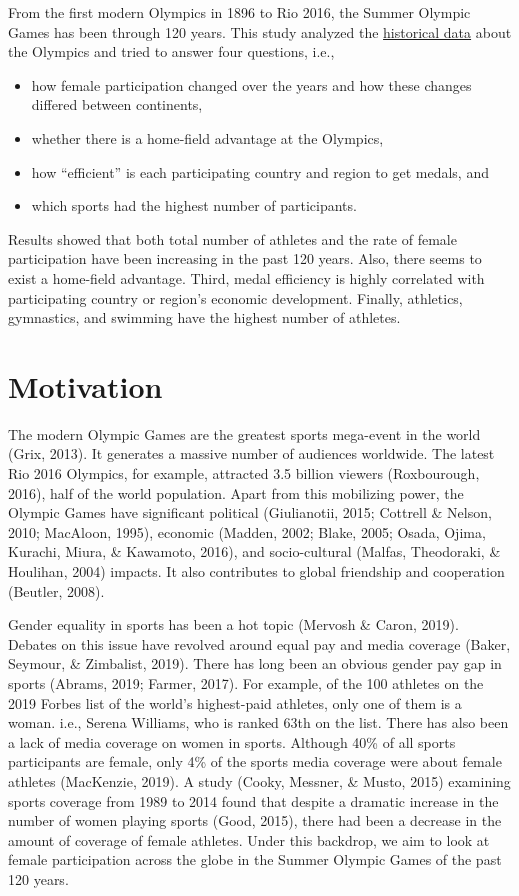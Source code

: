 \documentclass[
]{article}
\begin{document}
From the first modern Olympics in 1896 to Rio 2016, the Summer Olympic Games has been through 120 years. This study analyzed the \href{https://github.com/rgriff23/Olympic_history}{historical data} about the Olympics and tried to answer four questions, i.e.,

\begin{itemize}
\item
  how female participation changed over the years and how these changes differed between continents,
\item
  whether there is a home-field advantage at the Olympics,
\item
  how ``efficient'' is each participating country and region to get medals, and
\item
  which sports had the highest number of participants.
\end{itemize}

Results showed that both total number of athletes and the rate of female participation have been increasing in the past 120 years. Also, there seems to exist a home-field advantage. Third, medal efficiency is highly correlated with participating country or region's economic development. Finally, athletics, gymnastics, and swimming have the highest number of athletes.

\hypertarget{motivation}{%
\section{Motivation}\label{motivation}}

The modern Olympic Games are the greatest sports mega-event in the world (Grix, 2013). It generates a massive number of audiences worldwide. The latest Rio 2016 Olympics, for example, attracted 3.5 billion viewers (Roxbourough, 2016), half of the world population. Apart from this mobilizing power, the Olympic Games have significant political (Giulianotii, 2015; Cottrell \& Nelson, 2010; MacAloon, 1995), economic (Madden, 2002; Blake, 2005; Osada, Ojima, Kurachi, Miura, \& Kawamoto, 2016), and socio-cultural (Malfas, Theodoraki, \& Houlihan, 2004) impacts. It also contributes to global friendship and cooperation (Beutler, 2008).

Gender equality in sports has been a hot topic (Mervosh \& Caron, 2019). Debates on this issue have revolved around equal pay and media coverage (Baker, Seymour, \& Zimbalist, 2019). There has long been an obvious gender pay gap in sports (Abrams, 2019; Farmer, 2017). For example, of the 100 athletes on the 2019 Forbes list of the world's highest-paid athletes, only one of them is a woman. i.e., Serena Williams, who is ranked 63th on the list. There has also been a lack of media coverage on women in sports. Although 40\% of all sports participants are female, only 4\% of the sports media coverage were about female athletes (MacKenzie, 2019). A study (Cooky, Messner, \& Musto, 2015) examining sports coverage from 1989 to 2014 found that despite a dramatic increase in the number of women playing sports (Good, 2015), there had been a decrease in the amount of coverage of female athletes. Under this backdrop, we aim to look at female participation across the globe in the Summer Olympic Games of the past 120 years.
\end{document}
